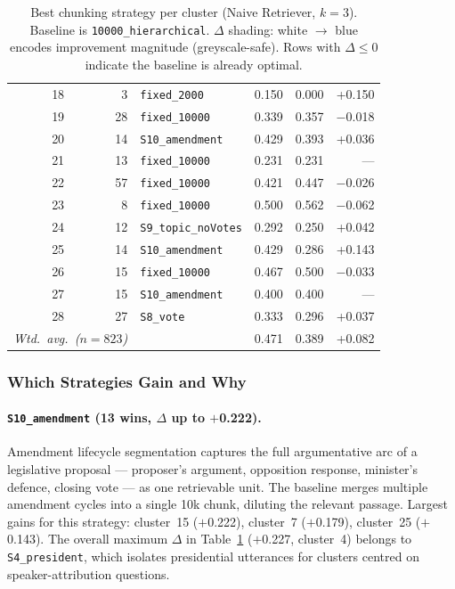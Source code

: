 \begin{table}[htbp]
{\begin{tabular}{r r l r r r}
 18  &   3 & \texttt{fixed\_2000}          & 0.150 & 0.000 & \cellcolor{db2}+0.150 \\
 19  &  28 & \texttt{fixed\_10000}        & 0.339 & 0.357 & $-$0.018 \\
 20  &  14 & \texttt{S10\_amendment}      & 0.429 & 0.393 & \cellcolor{db1}+0.036 \\
 21  &  13 & \texttt{fixed\_10000}        & 0.231 & 0.231 & \multicolumn{1}{r}{—} \\
 22  &  57 & \texttt{fixed\_10000}        & 0.421 & 0.447 & $-$0.026 \\
 23  &   8 & \texttt{fixed\_10000}        & 0.500 & 0.562 & $-$0.062 \\
 24  &  12 & \texttt{S9\_topic\_noVotes}  & 0.292 & 0.250 & \cellcolor{db1}+0.042 \\
 25  &  14 & \texttt{S10\_amendment}      & 0.429 & 0.286 & \cellcolor{db2}+0.143 \\
 26  &  15 & \texttt{fixed\_10000}        & 0.467 & 0.500 & $-$0.033 \\
 27  &  15 & \texttt{S10\_amendment}       & 0.400 & 0.400 & \multicolumn{1}{r}{—} \\
 28  &  27 & \texttt{S8\_vote}             & 0.333 & 0.296 & \cellcolor{db1}+0.037 \\
\midrule
\multicolumn{2}{r}{\textit{Wtd.\ avg.\ ($n=823$)}} & & 0.471 & 0.389 & \cellcolor{db1}+0.082 \\
\bottomrule
\end{tabular}%
}
\caption{Best chunking strategy per cluster (Naive Retriever, $k=3$).
Baseline is \texttt{10000\_hierarchical}.
$\Delta$ shading: white $\to$ blue encodes improvement magnitude (greyscale-safe).
Rows with $\Delta \le 0$ indicate the baseline is already optimal.}
\label{tab:cluster-best-chunking}
\end{table}

\subsubsection{Which Strategies Gain and Why}
\label{sec:indexing-analysis}

\paragraph{\texttt{S10\_amendment} (13 wins, $\Delta$ up to $+$0.222).}
Amendment lifecycle segmentation captures the full argumentative arc of a
legislative proposal — proposer's argument, opposition response, minister's
defence, closing vote — as one retrievable unit.
The baseline merges multiple amendment cycles into a single 10k chunk, diluting
the relevant passage.
Largest gains for this strategy: cluster~15 ($+$0.222), cluster~7 ($+$0.179),
cluster~25 ($+$0.143).
The overall maximum $\Delta$ in Table~\ref{tab:cluster-best-chunking}
($+$0.227, cluster~4) belongs to \texttt{S4\_president}, which isolates
presidential utterances for clusters centred on speaker-attribution questions.

